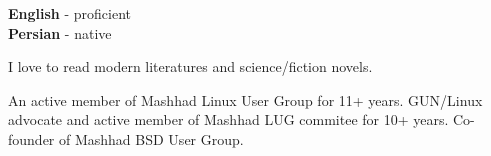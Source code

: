 \documentclass[12pt]{developercv}
\begin{document}
\begin{minipage}[t]{0.3\textwidth}
	\vspace{-\baselineskip} %

	
	\textbf{English} - proficient\\
	\textbf{Persian} - native\\
\end{minipage}
\hfill
\begin{minipage}[t]{0.3\textwidth}
	\vspace{-\baselineskip} %
	
	
	I love to read modern literatures and science/fiction novels.
\end{minipage}
\hfill
\begin{minipage}[t]{0.3\textwidth}
	\vspace{-\baselineskip} %
	
	
	An active member of Mashhad Linux User Group for 11+  years.
	GUN/Linux advocate and active member of Mashhad LUG commitee
	for 10+ years.
	Co-founder of Mashhad BSD User Group.
	
\end{minipage}

\end{document}
